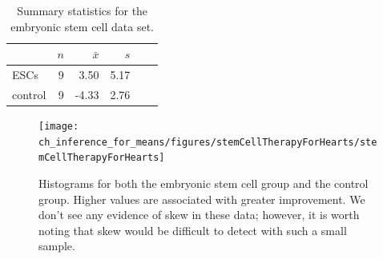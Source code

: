 
\begin{table}[h]
\centering
\begin{tabular}{l rrrrr}
\hline
\hspace{10mm}	& $n$	& $\bar{x}$	& $s$  	 \\
\hline
ESCs		& 9		& 3.50		& 5.17  	\\
control		& 9		& -4.33		& 2.76  	 \\
\hline
\end{tabular}
\caption{Summary statistics for the embryonic stem cell data set.}
\label{summaryStatsForSheepHeartDataWhoReceivedMiceESCs}
\end{table}

\begin{figure}
\centering
\texttt{[image: ch\_inference\_for\_means/figures/stemCellTherapyForHearts/stemCellTherapyForHearts]}
\caption{Histograms for both the embryonic stem cell group and the control group. Higher values are associated with greater improvement. We don't see any evidence of skew in these data; however, it is worth noting that skew would be difficult to detect with such a small sample.}
\label{stemCellTherapyForHearts}
\end{figure}

